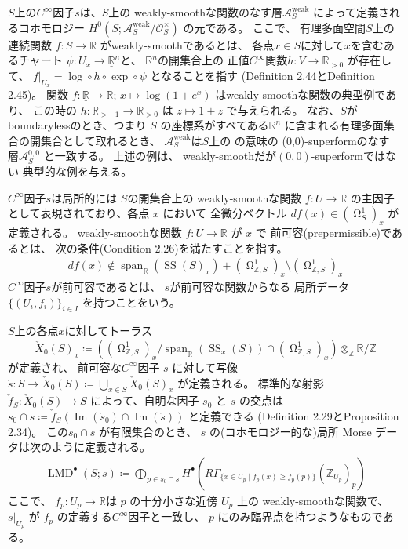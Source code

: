 \documentclass[uplatex,dvipdfmx,12pt]{jsarticle}
\numberwithin{equation}{section}
\theoremstyle{definition}
\newcommand{\deq}{\coloneqq}
\newcommand{\opn}[1]{\operatorname{#1}}
\DeclareMathOperator{\tform}{\Omega}
\begin{document}
$S$上の$C^{\infty}$因子$s$は、$S$上の
weakly-smoothな関数のなす層$\mathcal{A}^{\mathrm{weak}}_S$
によって定義されるコホモロジー
$H^{0}(S;\mathcal{A}^{\mathrm{weak}}_S/\mathcal{O}^{\times}_S)$
の元である。
ここで、
有理多面空間$S$上の連続関数
$f\colon S\to \mathbb{R}$
がweakly-smoothであるとは、
各点$x\in S$に対して$x$を含むあるチャート
$\psi \colon U_x\to \underline{\mathbb{R}}^{n}$と、
$\mathbb{R}^{n}$の開集合上の
正値$C^{\infty}$関数$h\colon V\to \mathbb{R}_{>0}$
が存在して、
$f|_{U_x}=\opn{log}\circ h\circ \opn{exp}\circ \psi$
となることを指す
(Definition 2.44とDefinition 2.45)。
関数
$
f\colon \underline{\mathbb{R}}\to \mathbb{R}
$;
$
x\mapsto \opn{log}(1+e^{x})
$
はweakly-smoothな関数の典型例であり、
この時の
$
h \colon \mathbb{R}_{>-1} \to \mathbb{R}_{>0}
$
は
$
z \mapsto 1+z
$
で与えられる。
なお、$S$がboundarylessのとき、つまり
$S$ の座標系がすべてある$\mathbb{R}^{n}$ 
に含まれる有理多面集合の開集合として取れるとき、
$\mathcal{A}^{\mathrm{weak}}_S$は$S$上の
\cite{MR3903579}の意味の
(0,0)-superformのなす
層$\mathcal{A}^{0,0}_S$
と一致する。
上述の例は、
weakly-smoothだが$(0,0)$-superformではない
典型的な例を与える。

$C^{\infty}$因子$s$は局所的には
$S$の開集合上の 
weakly-smoothな関数 $f\colon U\to \mathbb{R}$
の主因子として表現されており、各点 $x$ において
全微分ベクトル $df(x)\in(\tform_{S}^{1})_x$ 
が定義される。
weakly-smoothな関数
$f\colon U \to \mathbb{R}$ が $x$ で
前可容(prepermissible)であるとは、
次の条件(Condition 2.26)を満たすことを指す。
\begin{align}
df(x)\notin\opn{span}_{\mathbb{R}}(\opn{SS}(S)_x)+
(\tform_{\mathbb{Z},S}^{1})_x 
\setminus (\tform_{\mathbb{Z},S}^{1})_x
\end{align}
$C^{\infty}$因子$s$が前可容であるとは、
$s$が前可容な関数からなる
局所データ$\{(U_i,f_i)\}_{i\in I}$
を持つことをいう。

$S$上の各点$x$に対してトーラス
\begin{equation}
\check{X}_0(S)_x\deq ((\tform^{1}_{\mathbb{Z},S})_x/
\opn{span}_{\mathbb{R}}(\opn{SS}_x(S))\cap 
(\tform^{1}_{\mathbb{Z},S})_x)\otimes_{\mathbb{Z}}
\mathbb{R}/\mathbb{Z}
\end{equation}
が定義され、
前可容な$C^{\infty}$因子 $s$ に対して写像
$\check{s}\colon S\to \check{X}_0(S)\deq 
\bigcup_{x\in S} \check{X}_0(S)_x$ が定義される。 
標準的な射影 $\check{f}_{S}\colon \check{X}_0(S)\to S$
によって、自明な因子 $s_0$ と $s$ の交点は
$s_0\cap s\deq \check{f}_{S}(\opn{Im}(\check{s}_0)\cap 
\opn{Im}(\check{s}))$ と定義できる
(Definition 2.29とProposition 2.34)。
この$s_0\cap s$ が有限集合のとき、
$s$ の(コホモロジー的な)局所 Morse データは次のように定義される。
\begin{align} \label{equation-local-morse-data}
\opn{LMD}^{\bullet}(S;s)\deq 
\bigoplus_{p\in s_0\cap s} 
H^{\bullet}(R\Gamma_{\{x\in U_p\mid f_p(x)\geq f_p(p)\}}(\mathbb{Z}_{U_p})_p)
\end{align}
ここで、
$f_p\colon U_p\to \mathbb{R}$は
$p$ の十分小さな近傍 $U_p$ 上の weakly-smoothな関数で、
$s|_{U_p}$ が $f_p$ の定義する$C^{\infty}$因子と一致し、
$p$ にのみ臨界点を持つようなものである。
\end{document}
